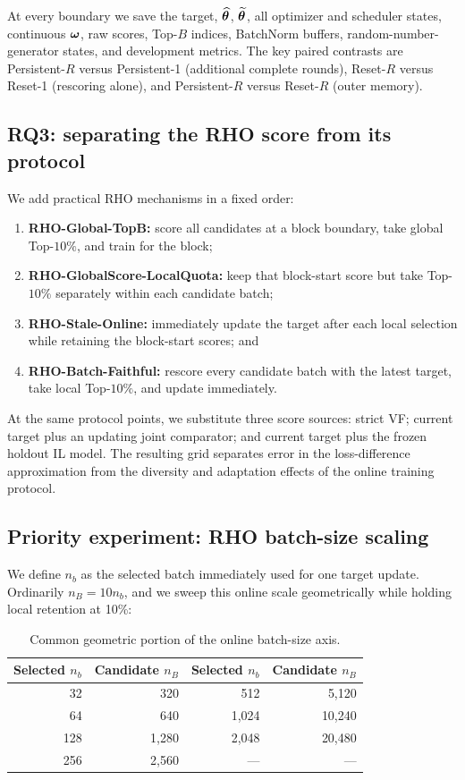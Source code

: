 At every boundary we save the target, $\widehat{{\bm{\theta}}}$, $\widetilde{{\bm{\theta}}}$, all
optimizer and scheduler states, continuous ${\bm{\omega}}$, raw scores, Top-$B$
indices, BatchNorm buffers, random-number-generator states, and development
metrics. The key paired contrasts are Persistent-$R$ versus Persistent-1
(additional complete rounds), Reset-$R$ versus Reset-1 (rescoring alone), and
Persistent-$R$ versus Reset-$R$ (outer memory).

\subsection{RQ3: separating the RHO score from its protocol}

We add practical RHO mechanisms in a fixed order:
\begin{enumerate}
    \item \textbf{RHO-Global-TopB:} score all candidates at a block boundary,
    take global Top-$10\%$, and train for the block;
    \item \textbf{RHO-GlobalScore-LocalQuota:} keep that block-start score but
    take Top-$10\%$ separately within each candidate batch;
    \item \textbf{RHO-Stale-Online:} immediately update the target after each
    local selection while retaining the block-start scores; and
    \item \textbf{RHO-Batch-Faithful:} rescore every candidate batch with the
    latest target, take local Top-$10\%$, and update immediately.
\end{enumerate}
At the same protocol points, we substitute three score sources: strict VF;
current target plus an updating joint comparator; and current target plus the
frozen holdout IL model. The resulting grid separates error in the
loss-difference approximation from the diversity and adaptation effects of
the online training protocol.

\subsection{Priority experiment: RHO batch-size scaling}

We define $n_b$ as the selected batch immediately used for one target update.
Ordinarily $n_B=10n_b$, and we sweep this online scale geometrically while
holding local retention at 10\%:
\begin{table}[h]
\centering
\caption{Common geometric portion of the online batch-size axis.}
\label{tab:rho-batch}
\small
\begin{tabular}{rrrr}
\toprule
Selected $n_b$ & Candidate $n_B$ & Selected $n_b$ & Candidate $n_B$ \\
\midrule
32 & 320 & 512 & 5,120 \\
64 & 640 & 1,024 & 10,240 \\
128 & 1,280 & 2,048 & 20,480 \\
256 & 2,560 & --- & --- \\
\bottomrule
\end{tabular}
\end{table}

